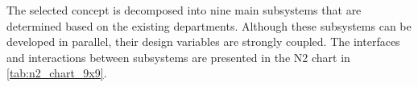 










The selected concept is decomposed into nine main subsystems that are determined based on the existing departments.
Although these subsystems can be developed in parallel, their design variables are strongly coupled. The interfaces and interactions between subsystems are presented in the N2 chart in \autoref{tab:n2_chart_9x9}. 



